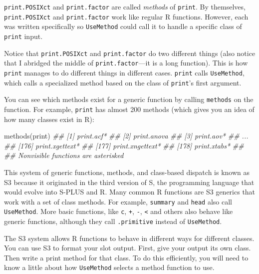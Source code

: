\documentclass[
  letterpaper,
  DIV=11,
  numbers=noendperiod]{scrbook}
\newenvironment{Shaded}{\begin{snugshade}}{\end{snugshade}}
\newcommand{\DocumentationTok}[1]{\textcolor[rgb]{0.37,0.37,0.37}{\textit{#1}}}
\newcommand{\FunctionTok}[1]{\textcolor[rgb]{0.28,0.35,0.67}{#1}}
\newcommand{\NormalTok}[1]{\textcolor[rgb]{0.00,0.23,0.31}{#1}}
\begin{document}
\texttt{print.POSIXct} and \texttt{print.factor} are called
\emph{methods} of \texttt{print}. By themselves, \texttt{print.POSIXct}
and \texttt{print.factor} work like regular R functions. However, each
was written specifically so \texttt{UseMethod} could call it to handle a
specific class of \texttt{print} input.

Notice that \texttt{print.POSIXct} and \texttt{print.factor} do two
different things (also notice that I abridged the middle of
\texttt{print.factor}---it is a long function). This is how
\texttt{print} manages to do different things in different cases.
\texttt{print} calls \texttt{UseMethod}, which calls a specialized
method based on the class of \texttt{print}'s first argument.

You can see which methods exist for a generic function by calling
\texttt{methods} on the function. For example, \texttt{print} has almost
200 methods (which gives you an idea of how many classes exist in R):

\begin{Shaded}
\begin{Highlighting}[]
\FunctionTok{methods}\NormalTok{(print)}
\DocumentationTok{\#\#   [1] print.acf*                                   }
\DocumentationTok{\#\#   [2] print.anova                                  }
\DocumentationTok{\#\#   [3] print.aov*                                   }
\DocumentationTok{\#\#  ...                      }
\DocumentationTok{\#\# [176] print.xgettext*                              }
\DocumentationTok{\#\# [177] print.xngettext*                             }
\DocumentationTok{\#\# [178] print.xtabs*}
\DocumentationTok{\#\#}
\DocumentationTok{\#\#   Nonvisible functions are asterisked}
\end{Highlighting}
\end{Shaded}

This system of generic functions, methods, and class-based dispatch is
known as S3 because it originated in the third version of S, the
programming language that would evolve into S-PLUS and R. Many common R
functions are S3 generics that work with a set of class methods. For
example, \texttt{summary} and \texttt{head} also call
\texttt{UseMethod}. More basic functions, like \texttt{c}, \texttt{+},
\texttt{-}, \texttt{\textless{}} and others also behave like generic
functions, although they call \texttt{.primitive} instead of
\texttt{UseMethod}.

The S3 system allows R functions to behave in different ways for
different classes. You can use S3 to format your slot output. First,
give your output its own class. Then write a print method for that
class. To do this efficiently, you will need to know a little about how
\texttt{UseMethod} selects a method function to use.
\end{document}
